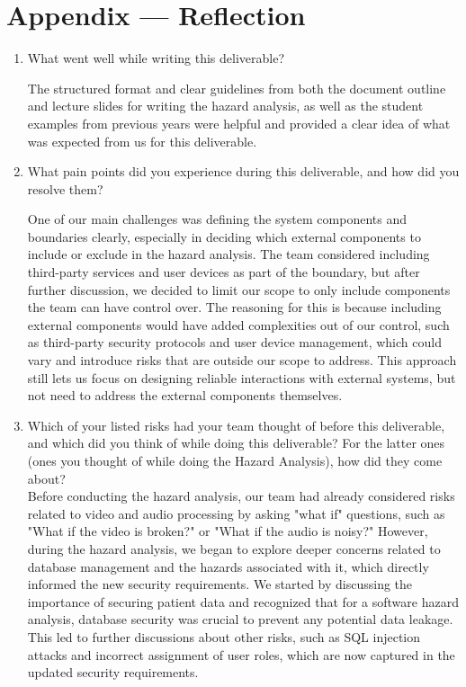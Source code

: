 \documentclass{article}
\begin{document}
\section*{Appendix --- Reflection}



\begin{enumerate}
    \item What went well while writing this deliverable? 
    
    The structured format and clear guidelines from both the document outline and lecture slides for writing the hazard 
    analysis, as well as the student examples from previous years were helpful and provided a clear idea of what was 
    expected from us for this deliverable.\\

    \item What pain points did you experience during this deliverable, and how
    did you resolve them?

    One of our main challenges was defining the system components and boundaries clearly, especially in deciding which 
    external components to include or exclude in the hazard analysis. The team considered including third-party services 
    and user devices as part of the boundary, but after further discussion, we decided to limit our scope to only include 
    components the team can have control over. The reasoning for this is because including external components would have 
    added complexities out of our control, such as third-party security protocols and user device management, which could 
    vary and introduce risks that are outside our scope to address. This approach still lets us focus on designing reliable 
    interactions with external systems, but not need to address the external components themselves.\\

    \item Which of your listed risks had your team thought of before this
    deliverable, and which did you think of while doing this deliverable? For
    the latter ones (ones you thought of while doing the Hazard Analysis), how
    did they come about?\\
    Before conducting the hazard analysis, our team had already considered risks 
    related to video and audio processing by asking "what if" questions, such 
    as "What if the video is broken?" or "What if the audio is noisy?" However, 
    during the hazard analysis, we began to explore deeper concerns related to database 
    management and the hazards associated with it, which directly informed the new security 
    requirements. We started by discussing the importance of securing patient data and 
    recognized that for a software hazard analysis, database security was crucial to 
    prevent any potential data leakage. This led to further discussions about other risks, 
    such as SQL injection attacks and incorrect assignment of user roles, which are now 
    captured in the updated security requirements.



\end{enumerate}
\end{document}
